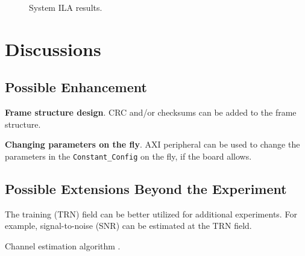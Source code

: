 \documentclass[journal,twoside]{IEEEtran}
\begin{document}
    \begin{figure}
      \setlength{\tabcolsep}{2pt}
      \caption{System ILA results.}
    \end{figure}

  \section{Discussions}

    \subsection{Possible Enhancement}

      \textbf{Frame structure design}.
      CRC and/or checksums can be added to the frame structure.

      \textbf{Changing parameters on the fly}.
      AXI peripheral \cite{xilinx:pg127} can be used to change the parameters in the \texttt{Constant\_Config} on the fly,
      if the board allows.

    \subsection{Possible Extensions Beyond the Experiment}

      The training (TRN) field can be better utilized for additional experiments.
      For example, signal-to-noise (SNR) can be estimated at the TRN field.

      Channel estimation algorithm \cite{zhao2023ompl,you2023beam}.
\end{document}

